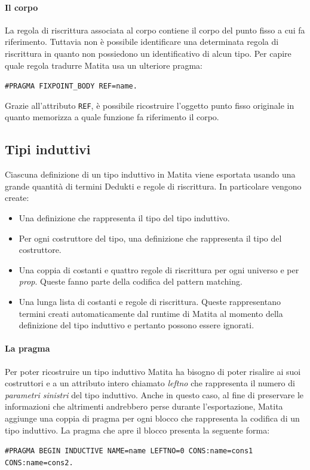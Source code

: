 \documentclass[12pt,a4paper]{mimosis}
\begin{document}
\paragraph{Il corpo}
La regola di riscrittura associata al corpo contiene il corpo del punto fisso
a cui fa riferimento. Tuttavia non è possibile identificare una determinata
regola di riscrittura in quanto non possiedono un identificativo di alcun 
tipo. Per capire quale regola tradurre Matita usa un ulteriore pragma:
\begin{center}
  \texttt{\#PRAGMA FIXPOINT\_BODY REF=name.}
\end{center}

Grazie all'attributo \texttt{REF}, è possibile ricostruire l'oggetto punto fisso originale
in quanto memorizza a quale funzione fa riferimento il corpo.

\subsection{Tipi induttivi}\label{sottosezioneTipiInduttivi}
Ciascuna definizione di un tipo induttivo in Matita viene esportata usando
una grande quantità di termini Dedukti e regole di riscrittura. In particolare
vengono create:
\begin{itemize}
  \item Una definizione che rappresenta il tipo del tipo induttivo.
  \item Per ogni costruttore del tipo, una definizione che rappresenta il
    tipo del costruttore.
  \item Una coppia di costanti e quattro regole di riscrittura per ogni universo
    e per \textit{prop}. Queste fanno parte della codifica del pattern matching.
  \item Una lunga lista di costanti e regole di riscrittura. Queste rappresentano
    termini creati automaticamente dal runtime di Matita al momento della
    definizione del tipo induttivo e pertanto possono essere ignorati.
\end{itemize}

\paragraph{La pragma}
Per poter ricostruire un tipo induttivo Matita ha bisogno di poter risalire
ai suoi costruttori e a un attributo intero chiamato \textit{leftno} che 
rappresenta il numero di \textit{parametri sinistri} del tipo induttivo.
Anche in questo caso, al fine di preservare le informazioni che altrimenti
andrebbero perse durante l'esportazione, Matita aggiunge una coppia di pragma
per ogni blocco che rappresenta la codifica di un tipo induttivo.
La pragma che apre il blocco presenta la seguente forma:
\begin{center}
  \texttt{\#PRAGMA BEGIN INDUCTIVE NAME=name LEFTNO=0 CONS:name=cons1 CONS:name=cons2.}
\end{center}
\end{document}
